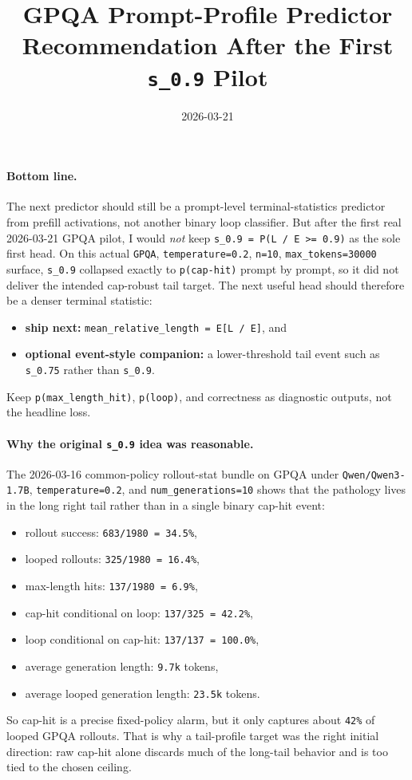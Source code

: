 \documentclass[11pt]{article}
\title{GPQA Prompt-Profile Predictor Recommendation After the First \texttt{s\_0.9} Pilot}
\author{}
\date{2026-03-21}
\begin{document}
\maketitle

\paragraph{Bottom line.}
The next predictor should still be a prompt-level terminal-statistics predictor
from prefill activations, not another binary loop classifier. But after the
first real 2026-03-21 GPQA pilot, I would \emph{not} keep
\texttt{s\_0.9 = P(L / E >= 0.9)} as the sole first head. On this actual
\texttt{GPQA}, \texttt{temperature=0.2}, \texttt{n=10}, \texttt{max\_tokens=30000}
surface, \texttt{s\_0.9} collapsed exactly to \texttt{p(cap-hit)} prompt by
prompt, so it did not deliver the intended cap-robust tail target. The next
useful head should therefore be a denser terminal statistic:
\begin{itemize}[leftmargin=1.5em]
\item \textbf{ship next:} \texttt{mean\_relative\_length = E[L / E]}, and
\item \textbf{optional event-style companion:} a lower-threshold tail event such
as \texttt{s\_0.75} rather than \texttt{s\_0.9}.
\end{itemize}
Keep \texttt{p(max\_length\_hit)}, \texttt{p(loop)}, and correctness as
diagnostic outputs, not the headline loss.

\paragraph{Why the original \texttt{s\_0.9} idea was reasonable.}
The 2026-03-16 common-policy rollout-stat bundle on GPQA under
\texttt{Qwen/Qwen3-1.7B}, \texttt{temperature=0.2}, and \texttt{num\_generations=10}
shows that the pathology lives in the long right tail rather than in a single
binary cap-hit event:
\begin{itemize}[leftmargin=1.5em]
\item rollout success: \texttt{683/1980 = 34.5\%},
\item looped rollouts: \texttt{325/1980 = 16.4\%},
\item max-length hits: \texttt{137/1980 = 6.9\%},
\item cap-hit conditional on loop: \texttt{137/325 = 42.2\%},
\item loop conditional on cap-hit: \texttt{137/137 = 100.0\%},
\item average generation length: \texttt{9.7k} tokens,
\item average looped generation length: \texttt{23.5k} tokens.
\end{itemize}
So cap-hit is a precise fixed-policy alarm, but it only captures about
\texttt{42\%} of looped GPQA rollouts. That is why a tail-profile target was the
right initial direction: raw cap-hit alone discards much of the long-tail
behavior and is too tied to the chosen ceiling.
\end{document}
